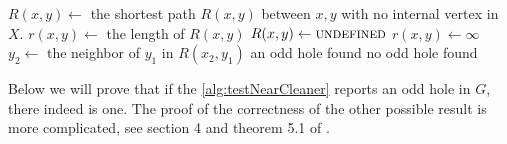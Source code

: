 \begin{algorithmic}[1]
				\ls $R(x, y) \gets$ the shortest path $R(x, y)$ between $x, y$ with no
				\lsx internal vertex in $X$.
				\ls $r(x, y) \gets$ the length of $R(x, y)$
			\mElse
				\ls $R(x, y) \gets \textsc{undefined}$
				\ls $r(x, y) \gets \infty$
			\mEndIf
						\ls $y_2 \gets$ the neighbor of $y_1$ in $R(x_2, y_1)$
						\ls \RETURN an odd hole found
						\mEndIf
					\mEndIf
				\mEndFor
			\mEndFor
		\mEndFor
		\RETURN no odd hole found
	\mEndProcedure
\end{algorithmic}



Below we will prove that if the \cref{alg:testNearCleaner} reports an odd hole in $G$, there indeed is one. The proof of the correctness of the other possible result is more complicated, see section 4 and theorem 5.1 of \cite{MC05}.

